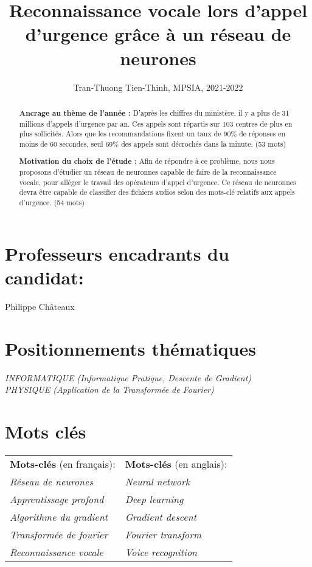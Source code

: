 \documentclass[12pt,a4paper, french]{article}
\title{Reconnaissance vocale lors d'appel d'urgence grâce à un réseau de neurones}
\author{Tran-Thuong Tien-Thinh, MPSIA, 2021-2022}
\date{}
\begin{document}
\maketitle

\begin{abstract}
\textbf{Ancrage au thème de l'année :}
D'après les chiffres du ministère, il y a plus de 31 millions d'appels d'urgence par an. Ces appels sont répartis sur 103 centres de plus en plus sollicités. Alors que les recommandations fixent un taux de 90\% de réponses en moins de 60 secondes, seul 69\% des appels sont décrochés dans la minute.  (53 mots)

\textbf{Motivation du choix de l’étude :} Afin de répondre à ce problème, nous nous proposons d'étudier un réseau de neuronnes capable de faire de la reconnaissance vocale, pour alléger le travail des opérateurs d'appel d'urgence. Ce réseau de neuronnes devra être capable de classifier des fichiers audios selon des mots-clé relatifs aux appels d’urgence. (54 mots)
\end{abstract}

\section*{Professeurs encadrants du candidat:}
Philippe Châteaux

\section*{Positionnements thématiques}
\noindent\textit{INFORMATIQUE (Informatique Pratique, Descente de Gradient)\\ PHYSIQUE (Application de la Transformée de Fourier)}

\section*{Mots clés}
\begin{tabular}{l l}
    \textbf{Mots-clés} (en français): & \textbf{Mots-clés} (en anglais): \\
    \textit{Réseau de neurones} & \textit{Neural network} \\
    \textit{Apprentissage profond} & \textit{Deep learning} \\
    \textit{Algorithme du gradient} & \textit{Gradient descent} \\
    \textit{Transformée de fourier} & \textit{Fourier transform} \\
    \textit{Reconnaissance vocale} & \textit{Voice recognition} \\
\end{tabular}
\end{document}
